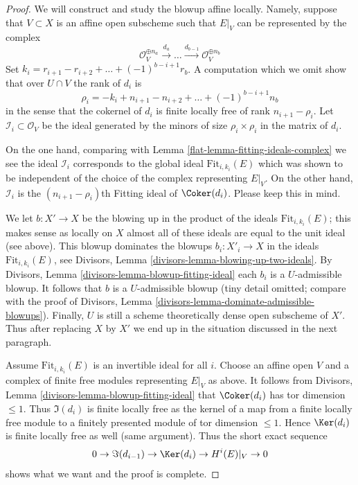 \begin{proof}

We will construct and study the blowup affine locally. Namely, suppose that
$V \subset X$ is an affine open subscheme such that
$E|_V$ can be represented by the complex
$$
\mathcal{O}_V^{\oplus n_a} \xrightarrow{d_a}
\ldots \xrightarrow{d_{b - 1}} \mathcal{O}_V^{\oplus n_b}
$$
Set $k_ i = r_{i + 1} - r_{i + 2} + \ldots + (-1)^{b - i + 1}r_b$.
A computation which we omit show that over $U \cap V$ the rank of
$d_i$ is
$$
\rho_i = - k_i + n_{i + 1} - n_{i + 2} + \ldots + (-1)^{b - i + 1}n_b
$$
in the sense that the cokernel of $d_i$ is finite locally
free of rank $n_{i + 1} - \rho_i$. Let
$\mathcal{I}_i \subset \mathcal{O}_V$ be the ideal generated by the minors
of size $\rho_i \times \rho_i$ in the matrix of $d_i$.

\medskip\noindent
On the one hand, comparing with Lemma \ref{flat-lemma-fitting-ideals-complex}
we see the ideal $\mathcal{I}_i$ corresponds to the global ideal
$\text{Fit}_{i, k_i}(E)$ which was shown to be
independent of the choice of the complex representing $E|_V$.
On the other hand, $\mathcal{I}_i$ is the $(n_{i + 1} - \rho_i)$th
Fitting ideal of $\Coker(d_i)$. Please keep this in mind.

\medskip\noindent
We let $b : X' \to X$ be the blowing up in the product of the ideals
$\text{Fit}_{i, k_i}(E)$; this makes sense as locally on $X$
almost all of these ideals are equal to the unit ideal (see above).
This blowup dominates the blowups $b_i : X'_i \to X$ in
the ideals $\text{Fit}_{i, k_i}(E)$, see
Divisors, Lemma \ref{divisors-lemma-blowing-up-two-ideals}.
By Divisors, Lemma \ref{divisors-lemma-blowup-fitting-ideal}
each $b_i$ is a $U$-admissible blowup. It follows that
$b$ is a $U$-admissible blowup (tiny detail omitted; compare with
the proof of Divisors, Lemma \ref{divisors-lemma-dominate-admissible-blowups}).
Finally, $U$ is still a scheme theoretically dense open subscheme of $X'$.
Thus after replacing $X$ by $X'$ we end up in the situation
discussed in the next paragraph.

\medskip\noindent
Assume $\text{Fit}_{i, k_i}(E)$ is an invertible ideal for all $i$.
Choose an affine open $V$ and a complex of finite free modules
representing $E|_V$ as above. It follows from
Divisors, Lemma \ref{divisors-lemma-blowup-fitting-ideal}
that $\Coker(d_i)$ has tor dimension $\leq 1$. Thus
$\Im(d_i)$ is finite locally free as the kernel of a map
from a finite locally free module to a finitely presented
module of tor dimension $\leq 1$. Hence $\Ker(d_i)$
is finite locally free as well (same argument). Thus the short
exact sequence
$$
0 \to \Im(d_{i - 1}) \to \Ker(d_i) \to H^i(E)|_V \to 0
$$
shows what we want and the proof is complete.
\end{proof}

